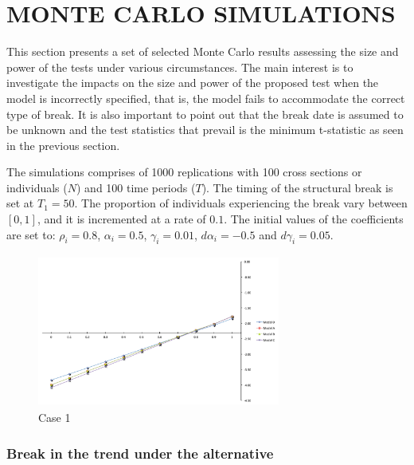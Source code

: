 \documentclass[a4paper,fleqn]{article} %
\begin{document}
\section{MONTE CARLO SIMULATIONS}
This section presents a set of selected Monte Carlo results assessing the size and power of the tests under various circumstances. The main interest is to investigate the impacts on the size and power of the proposed test when the model is incorrectly specified, that is, the model fails to accommodate the correct type of break. It is also important to point out that the break date is assumed to be unknown and the test statistics that prevail is the minimum t-statistic as seen in the previous section.

The simulations comprises of 1000 replications with 100 cross sections or individuals ($N$) and 100 time periods ($T$). The timing of the structural break is set at $T_1=50$. The proportion of individuals experiencing the break vary between $[0,1]$, and it is incremented at a rate of $0.1$. The initial values of the coefficients are set to: $\rho_i=0.8$, $\alpha_i=0.5$, $\gamma_i=0.01$, $d\alpha_i=-0.5$ and $d\gamma_i=0.05$.

\begin{figure}
\begin{center}
\includegraphics[width=8cm, height=5cm]{Case1.pdf}
\caption{Case 1}
\end{center}
\end{figure}

\subsubsection{Break in the trend under the alternative}
\end{document}

